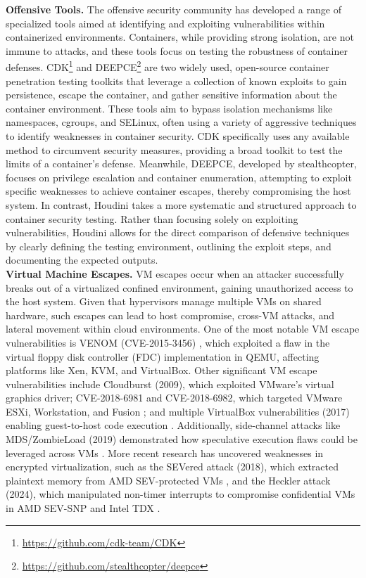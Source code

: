 \documentclass[12pt]{report}
\begin{document}
\begin{doublespace}
\noindent\textbf{Offensive Tools.} The offensive security community has developed a range of specialized tools aimed at identifying and exploiting vulnerabilities within containerized environments. Containers, while providing strong isolation, are not immune to attacks, and these tools focus on testing the robustness of container defenses. CDK\footnote{\url{https://github.com/cdk-team/CDK}} and DEEPCE\footnote{\url{https://github.com/stealthcopter/deepce}} are two widely used, open-source container penetration testing toolkits that leverage a collection of known exploits to gain persistence, escape the container, and gather sensitive information about the container environment. These tools aim to bypass isolation mechanisms like namespaces, cgroups, and SELinux, often using a variety of aggressive techniques to identify weaknesses in container security. CDK specifically uses any available method to circumvent security measures, providing a broad toolkit to test the limits of a container's defense. Meanwhile, DEEPCE, developed by stealthcopter, focuses on privilege escalation and container enumeration, attempting to exploit specific weaknesses to achieve container escapes, thereby compromising the host system. In contrast, Houdini takes a more systematic and structured approach to container security testing. Rather than focusing solely on exploiting vulnerabilities, Houdini allows for the direct comparison of defensive techniques by clearly defining the testing environment, outlining the exploit steps, and documenting the expected outputs.\\

\noindent\textbf{Virtual Machine Escapes.} VM escapes occur when an attacker successfully breaks out of a virtualized confined environment, gaining unauthorized access to the host system. Given that hypervisors manage multiple VMs on shared hardware, such escapes can lead to host compromise, cross-VM attacks, and lateral movement within cloud environments. One of the most notable VM escape vulnerabilities is VENOM (CVE-2015-3456) \cite{abdoul2018novel}, which exploited a flaw in the virtual floppy disk controller (FDC) implementation in QEMU, affecting platforms like Xen, KVM, and VirtualBox. Other significant VM escape vulnerabilities include Cloudburst (2009), which exploited VMware's virtual graphics driver; CVE-2018-6981 and CVE-2018-6982, which targeted VMware ESXi, Workstation, and Fusion \cite{vmware2018escape}; and multiple VirtualBox vulnerabilities (2017) enabling guest-to-host code execution \cite{virtualbox2017bugs}. Additionally, side-channel attacks like MDS/ZombieLoad (2019) demonstrated how speculative execution flaws could be leveraged across VMs \cite{mds2019attack}. More recent research has uncovered weaknesses in encrypted virtualization, such as the SEVered attack (2018), which extracted plaintext memory from AMD SEV-protected VMs \cite{severed2018}, and the Heckler attack (2024), which manipulated non-timer interrupts to compromise confidential VMs in AMD SEV-SNP and Intel TDX \cite{heckler2024}.\\


\end{doublespace}
\end{document}
